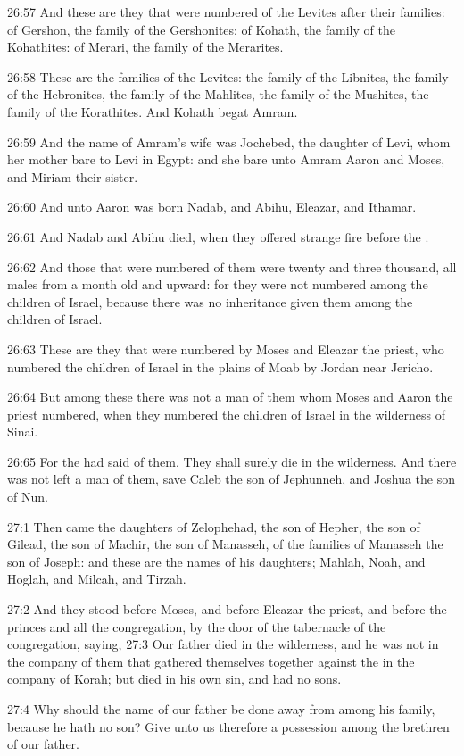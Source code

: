26:57 And these are they that were numbered of the Levites after their
families: of Gershon, the family of the Gershonites: of Kohath, the
family of the Kohathites: of Merari, the family of the Merarites.

26:58 These are the families of the Levites: the family of the
Libnites, the family of the Hebronites, the family of the Mahlites,
the family of the Mushites, the family of the Korathites. And Kohath
begat Amram.

26:59 And the name of Amram's wife was Jochebed, the daughter of Levi,
whom her mother bare to Levi in Egypt: and she bare unto Amram Aaron
and Moses, and Miriam their sister.

26:60 And unto Aaron was born Nadab, and Abihu, Eleazar, and Ithamar.

26:61 And Nadab and Abihu died, when they offered strange fire before
the \LORD.

26:62 And those that were numbered of them were twenty and three
thousand, all males from a month old and upward: for they were not
numbered among the children of Israel, because there was no
inheritance given them among the children of Israel.

26:63 These are they that were numbered by Moses and Eleazar the
priest, who numbered the children of Israel in the plains of Moab by
Jordan near Jericho.

26:64 But among these there was not a man of them whom Moses and Aaron
the priest numbered, when they numbered the children of Israel in the
wilderness of Sinai.

26:65 For the \LORD had said of them, They shall surely die in the
wilderness. And there was not left a man of them, save Caleb the son
of Jephunneh, and Joshua the son of Nun.

27:1 Then came the daughters of Zelophehad, the son of Hepher, the son
of Gilead, the son of Machir, the son of Manasseh, of the families of
Manasseh the son of Joseph: and these are the names of his daughters;
Mahlah, Noah, and Hoglah, and Milcah, and Tirzah.

27:2 And they stood before Moses, and before Eleazar the priest, and
before the princes and all the congregation, by the door of the
tabernacle of the congregation, saying, 27:3 Our father died in the
wilderness, and he was not in the company of them that gathered
themselves together against the \LORD in the company of Korah; but died
in his own sin, and had no sons.

27:4 Why should the name of our father be done away from among his
family, because he hath no son? Give unto us therefore a possession
among the brethren of our father.

